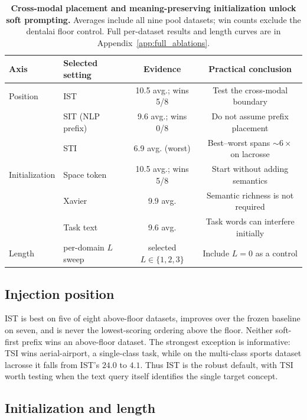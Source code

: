\documentclass{article}
\begin{document}
\begin{table}[t]
  \centering
  \caption{\textbf{Cross-modal placement and meaning-preserving initialization
  unlock soft prompting.}
  Averages include all nine pool datasets; win counts exclude the dentalai
  floor control. Full per-dataset results and length curves are in
  Appendix~\ref{app:full_ablations}.}
  \label{tab:core_ablations}
  \small
  \setlength{\tabcolsep}{6pt}
  \begin{tabular}{llcc}
    \toprule
    Axis & Selected setting & Evidence & Practical conclusion \\
    \midrule
    Position & IST & 10.5 avg.; wins 5/8 & Test the cross-modal boundary \\
             & SIT (NLP prefix) & 9.6 avg.; wins 0/8 & Do not assume prefix placement \\
             & STI & 6.9 avg. (worst) & Best--worst spans ${\sim}6\times$ on lacrosse \\
    \midrule
    Initialization & Space token & 10.5 avg.; wins 5/8 & Start without adding semantics \\
                   & Xavier & 9.9 avg. & Semantic richness is not required \\
                   & Task text & 9.6 avg. & Task words can interfere initially \\
    \midrule
    Length & per-domain $L$ sweep & selected $L\in\{1,2,3\}$ & Include $L=0$ as a control \\
    \bottomrule
  \end{tabular}
\end{table}

\subsection{Injection position}
\label{subsec:position}

IST is best on five of eight above-floor datasets, improves over the frozen
baseline on seven, and is never the lowest-scoring ordering above the floor.
Neither soft-first prefix wins an above-floor dataset.
The strongest exception is informative: TSI wins aerial-airport, a
single-class task, while on the multi-class sports dataset lacrosse it falls
from IST's $24.0$ to $4.1$.
Thus IST is the robust default, with TSI worth testing when the text query
itself identifies the single target concept.

\subsection{Initialization and length}
\label{subsec:init}
\label{subsec:length}
\end{document}

